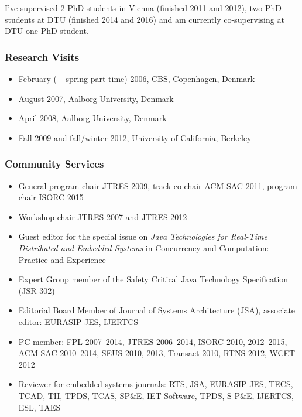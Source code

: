 \documentclass[%
    a4paper,
    12pt, %
    headinclude, footexclude,
    notitlepage,
    headsepline,
    pointlessnumbers,
    ]{scrartcl}
\begin{document}
I've supervised 2 PhD students in Vienna (finished 2011 and 2012), two PhD
students at DTU (finished 2014 and 2016) and am currently co-supervising at DTU
one PhD student.


\subsubsection*{Research Visits}

\begin{itemize}
  \item February (+ spring part time) 2006, CBS, Copenhagen,
      Denmark
  \item August 2007, Aalborg University, Denmark
  \item April 2008, Aalborg University, Denmark
  \item Fall 2009 and fall/winter 2012, University of California, Berkeley
\end{itemize}

\subsubsection*{Community Services}

\begin{itemize}
  \item General program chair JTRES 2009, track co-chair ACM SAC 2011, program chair ISORC 2015
  \item Workshop chair JTRES 2007 and JTRES 2012
  \item Guest editor for the special issue on \emph{Java
      Technologies for Real-Time Distributed and Embedded
      Systems} in Concurrency and Computation: Practice and
      Experience
  \item Expert Group member of the Safety Critical Java
      Technology Specification (JSR 302)
  \item Editorial Board Member of Journal of Systems Architecture (JSA),
  associate editor: EURASIP JES, IJERTCS
  \item PC member: FPL 2007--2014, JTRES 2006--2014, ISORC 2010, 2012--2015, ACM SAC 2010--2014, SEUS 2010, 2013, Transact 2010, RTNS 2012, WCET 2012
  \item Reviewer for embedded systems journals: RTS, JSA, EURASIP JES,
      TECS, TCAD, TII, TPDS, TCAS, SP\&E, IET Software, TPDS, S P\&E, IJERTCS, ESL, TAES
\end{itemize}
\end{document}
